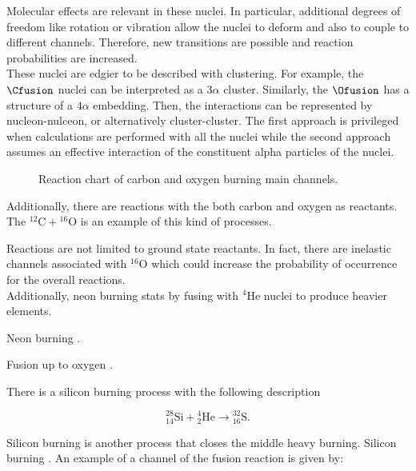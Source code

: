 \documentclass[openany]{book}
\begin{document}
Molecular effects are relevant in these nuclei. In particular, additional degrees of freedom like rotation or vibration allow the nuclei to deform and also to couple to different channels. Therefore, new transitions are possible and reaction probabilities are increased. \\

These nuclei are edgier to be described with clustering. For example, the $\Cfusion$ nuclei can be interpreted as a $3\alpha$ cluster. Similarly, the $\Ofusion$ has a structure of a $4\alpha$ embedding. Then, the interactions can be represented by nucleon-nulceon, or alternatively cluster-cluster. The first approach is privileged when calculations are performed with all the nuclei while the second approach assumes an effective interaction of the constituent alpha particles of the nuclei.  \\

\begin{figure}[H]
	
	\caption[Carbon and oxygen burning main channels.]{Reaction chart of carbon and oxygen burning main channels.}
	\label{fig:COchannels}
\end{figure}


Additionally, there are reactions with the both carbon and oxygen as reactants. The $\mathrm{{}^{12}C + {}^{16}O}$ is an example of this kind of processes. 

Reactions are not limited to ground state reactants. In fact, there are inelastic channels associated with $\mathrm{{}^{16}O}$ which could increase the probability of occurrence for the overall reactions.  \\

Additionally, neon burning stats by fusing with $\mathrm{{}^{4}He}$ nuclei to produce heavier elements.

 Neon burning \cite{arnett_1974}.

Fusion up to oxygen \cite{eleid_meyer_the_2004}.

There is a silicon burning process with the following description 

\begin{equation} \label{eq:reaction_28Sialpha}
	\mathrm{{}^{28}_{14}Si +{}^{4}_{2}He \rightarrow {}^{32}_{16}S}.
\end{equation}

Silicon burning is another process that closes the middle heavy burning. Silicon burning \cite{bodansky_clayton_fowler_1968}.  An example of a channel of the fusion reaction is given by:
\end{document}

